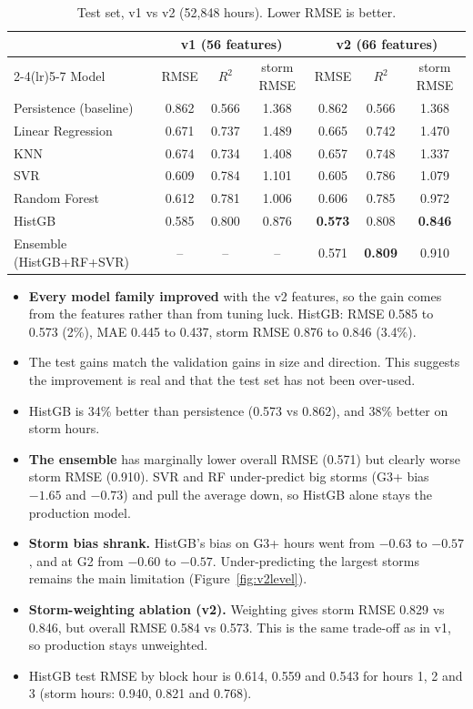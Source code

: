 \documentclass[11pt,a4paper]{article}
\begin{document}
\begin{table}[H]\centering\small
\caption{Test set, v1 vs v2 (52{,}848 hours). Lower RMSE is better.}\label{tab:v1v2test}
\begin{tabular}{lcccccc}\toprule
 & \multicolumn{3}{c}{v1 (56 features)} & \multicolumn{3}{c}{v2 (66 features)}\\
\cmidrule(lr){2-4}\cmidrule(lr){5-7}
Model & RMSE & $R^2$ & storm RMSE & RMSE & $R^2$ & storm RMSE\\\midrule
Persistence (baseline) & 0.862 & 0.566 & 1.368 & 0.862 & 0.566 & 1.368\\
Linear Regression & 0.671 & 0.737 & 1.489 & 0.665 & 0.742 & 1.470\\
KNN & 0.674 & 0.734 & 1.408 & 0.657 & 0.748 & 1.337\\
SVR & 0.609 & 0.784 & 1.101 & 0.605 & 0.786 & 1.079\\
Random Forest & 0.612 & 0.781 & 1.006 & 0.606 & 0.785 & 0.972\\
HistGB & 0.585 & 0.800 & 0.876 & \textbf{0.573} & 0.808 & \textbf{0.846}\\
Ensemble (HistGB+RF+SVR) & -- & -- & -- & 0.571 & \textbf{0.809} & 0.910\\\bottomrule
\end{tabular}
\end{table}

\begin{itemize}
\item \textbf{Every model family improved} with the v2 features, so the gain comes from the features rather than
from tuning luck. HistGB: RMSE 0.585 to 0.573 (2\%), MAE 0.445 to 0.437, storm RMSE 0.876 to 0.846 (3.4\%).
\item The test gains match the validation gains in size and direction. This suggests the improvement is real and
that the test set has not been over-used.
\item HistGB is 34\% better than persistence (0.573 vs 0.862), and 38\% better on storm hours.
\item \textbf{The ensemble} has marginally lower overall RMSE (0.571) but clearly worse storm RMSE (0.910). SVR and
RF under-predict big storms (G3+ bias $-1.65$ and $-0.73$) and pull the average down, so HistGB alone stays the
production model.
\item \textbf{Storm bias shrank.} HistGB's bias on G3+ hours went from $-0.63$ to $-0.57$, and at G2 from $-0.60$
to $-0.57$. Under-predicting the largest storms remains the main limitation (Figure~\ref{fig:v2level}).
\item \textbf{Storm-weighting ablation (v2).} Weighting gives storm RMSE 0.829 vs 0.846, but overall RMSE 0.584 vs
0.573. This is the same trade-off as in v1, so production stays unweighted.
\item HistGB test RMSE by block hour is 0.614, 0.559 and 0.543 for hours 1, 2 and 3 (storm hours: 0.940, 0.821
and 0.768).
\end{itemize}
\end{document}
